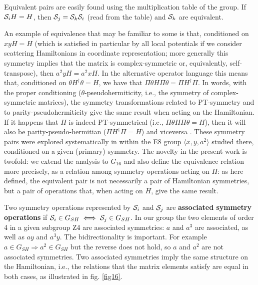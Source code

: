 {Equivalent pairs are easily found using the multiplication table of the group.  If ${\cal S}_i H=H$, then ${\cal S}_j={\cal S}_k {\cal S}_i$  (read from the table)
and ${\cal S}_k$  are equivalent.

An example of equivalence that may be familiar to some
is that, conditioned on $xy H=H$ (which is satisfied in particular by all local potentials if we consider scattering
Hamiltonians in coordinate representation; more generally this symmetry implies that the matrix is complex-symmetric
or, equivalently, self-transpose),
then $a^2y H=a^2x H$. In the alternative operator language this means that, conditioned on $\theta H^\dagger\theta=H$,
we have that $\Pi\theta H\Pi \theta =\Pi H^\dagger \Pi$. In words, with the proper conditioning ($\theta$-pseudohermiticity, i.e., the symmetry of complex-symmetric matrices), the symmetry transformations related to PT-symmetry and to parity-pseudohermiticity give the same result when acting on the Hamiltonian. If it happens that
$H$ is indeed PT-symmetrical (i.e., $\Pi\theta H\Pi \theta=H$), then it will also be parity-pseudo-hermitian
($\Pi H^\dagger \Pi=H$)
and viceversa \cite{Mostafazadeh2010,Znojil2015}. These symmetry pairs  were explored systematically in \cite{Ruschhaupt2017} within the E8 group $\langle x,y,a^2\rangle$ studied  there, conditioned on a given (primary) symmetry. The novelty in the present work is twofold:  we
extend the analysis to $G_{16}$ and also define the equivalence relation more precisely, as a relation among symmetry operations acting on $H$:
as here defined, the equivalent pair is not necessarily a pair of Hamiltonian symmetries, but a pair of operations that, when acting on $H$, give the same result.









Two symmetry operations  represented by ${\cal S}_i$  and ${\cal S}_j$
are {\bf associated symmetry operations} if ${\cal S}_i\in G_{SH}\iff {\cal S}_j\in G_{SH}$.
In our group the two elements of order 4 in a given subgroup Z4 are associated symmetries:  $a$ and $a^3$ are associated, as well as $ay$ and $a^3y$.  The bidirectionality is important. For example $a\in G_{SH}\Rightarrow a^2\in G_{SH}$
but the reverse does not hold, so $a$ and $a^2$  are not associated symmetries.
Two associated symmetries imply the same structure on the Hamiltonian, i.e., the relations
that the matrix elements satisfy are equal in both cases, as illustrated in fig. \ref{fig16}.

}
